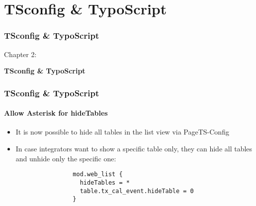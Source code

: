 %

\section{TSconfig \& TypoScript}
\begin{frame}[fragile]
	\frametitle{TSconfig \& TypoScript}

	\begin{center}\huge{Chapter 2:}\end{center}
	\begin{center}\huge{\color{typo3darkgrey}\textbf{TSconfig \& TypoScript}}\end{center}

\end{frame}

\begin{frame}[fragile]
	\frametitle{TSconfig \& TypoScript}
	\framesubtitle{Allow Asterisk for hideTables}

	\lstset{basicstyle=\tiny\ttfamily}

	\begin{itemize}
		\item It is now possible to hide all tables in the list view via
			PageTS-Config

		\item In case integrators want to show a specific table only, they
			can hide all tables and unhide only the specific one:

			\begin{lstlisting}
				mod.web_list {
				  hideTables = *
				  table.tx_cal_event.hideTable = 0
				}
			\end{lstlisting}

	\end{itemize}

\end{frame}


